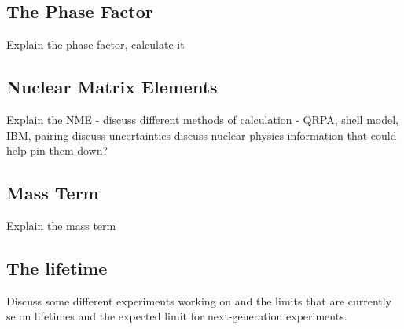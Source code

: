 \subsection{The Phase Factor}
Explain the phase factor, calculate it

\subsection{Nuclear Matrix Elements}
Explain the NME - discuss different methods of calculation - QRPA, shell model, IBM, pairing
discuss uncertainties
discuss nuclear physics information that could help pin them down?

\subsection{Mass Term}
Explain the mass term

\subsection{The lifetime}
Discuss some different experiments working on \zvbb and the limits that are currently se on lifetimes and the expected limit for next-generation experiments.


%
% 
% 

